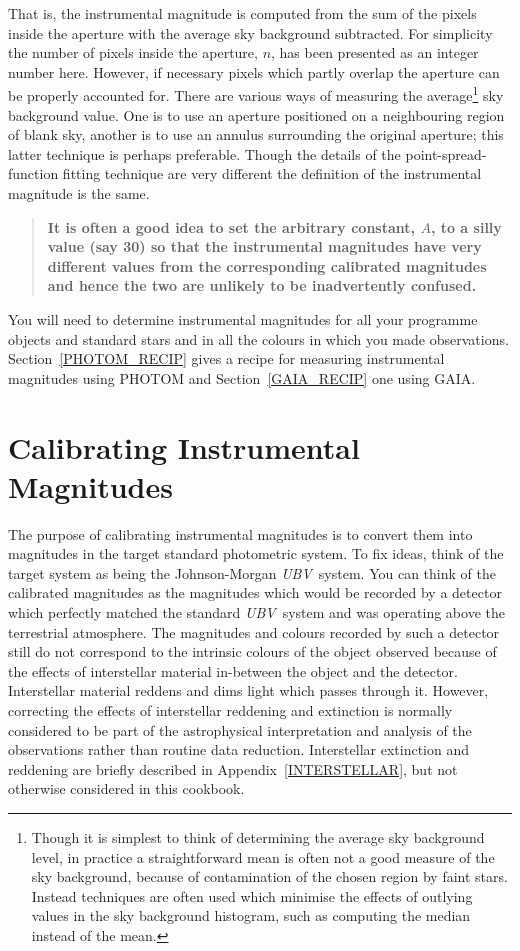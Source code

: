 \documentclass[twoside,11pt,nolof]{starlink}
\begin{document}
That is, the instrumental magnitude is computed from the sum of the
pixels inside the aperture with the average sky background subtracted.
For simplicity the number of pixels inside the aperture, $n$, has been
presented as an integer number here.  However, if necessary pixels
which partly overlap the aperture can be properly accounted for.  There
are various ways of measuring the average\footnote{Though it is simplest
to think of determining the average sky background level, in practice
a straightforward mean is often not a good measure of the sky
background, because of contamination of the chosen region by faint stars.
Instead techniques are often used which minimise the effects of outlying
values in the sky background histogram, such as computing the median
instead of the mean.} sky background value.  One is to use an aperture
positioned on a neighbouring region of blank sky, another is to use an
annulus surrounding the original aperture; this latter technique is
perhaps preferable.  Though the details of the point-spread-function
fitting technique are very different the definition of the instrumental
magnitude is the same.

\begin{quote}
\textbf{It is often a good idea to set the arbitrary constant, $A$, to a
silly value (say 30) so that the instrumental magnitudes have very
different values from the corresponding calibrated magnitudes and
hence the two are unlikely to be inadvertently confused.}
\end{quote}

You will need to determine instrumental magnitudes for all your
programme objects and standard stars and in all the colours in which
you made observations.  Section~\ref{PHOTOM_RECIP} gives a recipe
for measuring instrumental magnitudes using PHOTOM and
Section~\ref{GAIA_RECIP} one using GAIA.


\section{\label{CALIB_INSTR}Calibrating Instrumental
Magnitudes}

The purpose of calibrating instrumental magnitudes is to convert them
into magnitudes in the target standard photometric system.  To fix
ideas, think of the target system as being the Johnson-Morgan \textit{UBV}\, system.  You can think of the calibrated magnitudes as the
magnitudes which would be recorded by a detector which perfectly
matched the standard \textit{UBV}\, system and was operating above the
terrestrial atmosphere.  The magnitudes and colours recorded by such
a detector still do not correspond to the intrinsic colours of the
object observed because of the effects of interstellar material in-between
the object and the detector.  Interstellar material reddens and dims
light which passes through it.  However, correcting the effects of
interstellar reddening and extinction is normally considered to be part
of the astrophysical interpretation and analysis of the observations rather
than routine data reduction.  Interstellar extinction and reddening are
briefly described in Appendix~\ref{INTERSTELLAR}, but not otherwise
considered in this cookbook.
\end{document}
